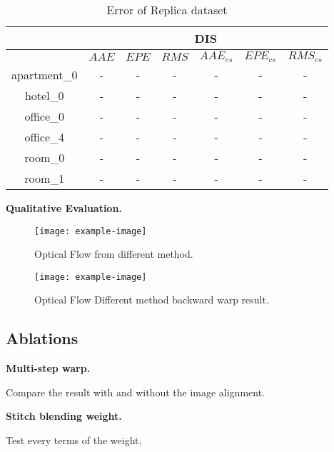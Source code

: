 

\begin{table}[h!]
	\centering
	\begin{tabular}{ c | c | c | c | c | c | c }
		\hline
		& \multicolumn{6}{c}{DIS}  \\
		\hline
		& ${AAE}$ & ${EPE}$ & ${RMS}$ & ${AAE_{cs}}$ & ${EPE_{cs}}$ & ${RMS_{cs}}$ \\
		\hline
		apartment\_0 & - & - & -  & - & - & -  \\ 
		\hline
		hotel\_0 & - & - & -  & - & - & -  \\ 
		\hline
		office\_0 & - & - & - & - & - & -  \\ 
		\hline
		office\_4 & - & - & -  & - & - & -  \\ 
		\hline
		room\_0 & - & - & - & - & - & -  \\ 
		\hline
		room\_1 & - & - & -  & - & - & -  \\ 
		\hline\hline
	\end{tabular}
	\caption{Error of Replica dataset}
	\label{fig:exp:quality}
\end{table}




\textbf{Qualitative Evaluation.}



\begin{figure}[hbt!]
	\centering
	\texttt{[image: example-image]}
	\caption{Optical Flow from different method.}
	\label{fig:exp:compflow}
\end{figure}

\begin{figure}[hbt!]
	\centering
	\texttt{[image: example-image]}
	\caption{Optical Flow Different method backward warp result.}
	\label{fig:exp:backwardwarp}
\end{figure}


\subsection{Ablations}

\textbf{Multi-step warp.}

Compare the result with and without the image alignment.

\textbf{Stitch blending weight.}

Test every terms of the weight,
